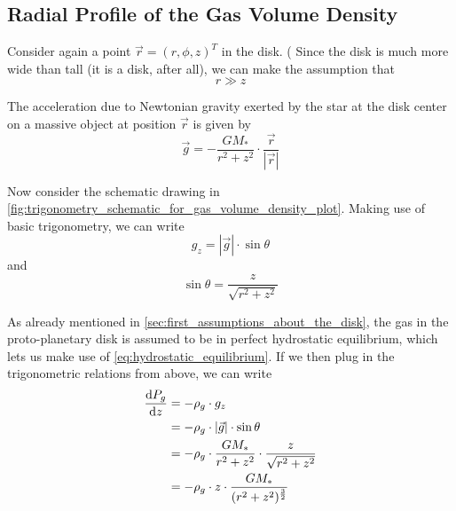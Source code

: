     \newpage\subsection{Radial Profile of the Gas Volume Density}
        
        Consider again a point $\vec r=(r,\phi,z)^T$ in the disk. ( Since the disk
        is much more wide than tall (it is a disk, after all), we can make the assumption that
        \begin{equation}
            \label{eq:r_much_bigger_than_z}
            r\gg z 
        \end{equation}

        The acceleration due to Newtonian gravity exerted by the star at the disk center 
        on a massive object at position $\vec r$ is given by
        \begin{equation}
            \vec g = -\frac{GM_*}{r^2+z^2} \cdot \frac{\vec r}{|\vec r|}
        \end{equation}

        Now consider the schematic drawing in
        \cref{fig:trigonometry_schematic_for_gas_volume_density_plot}.
        Making use of basic trigonometry, we can write
        \begin{equation}
            g_z = |\vec g| \cdot \sin\theta
        \end{equation}
        and
        \begin{equation}
            \sin\theta=\frac{z}{\sqrt{r^2+z^2}}
        \end{equation}

        As already mentioned in \cref{sec:first_assumptions_about_the_disk}, the gas in the 
        proto-planetary disk is assumed to be in perfect hydrostatic equilibrium, which lets us 
        make use of \cref{eq:hydrostatic_equilibrium}. If we then plug in the trigonometric 
        relations from above, we can write
        \begin{align}
            \frac{\text{d} P_g}{\text{d} z}
                &= -\rho_g \cdot g_z \\
                &= -\rho_g \cdot |\vec g| \cdot \sin\theta \\
                &= -\rho_g \cdot \frac{GM_*}{r^2+z^2} \cdot\frac{z}{\sqrt{r^2+z^2}} \\
                &= -\rho_g \cdot z \cdot\frac{GM_*}{ (r^2+z^2)^{\frac{3}{2}} }
                \label{eq:hydrostatic_equilibrium_with_plugged_in_trigonmetry}
        \end{align}

